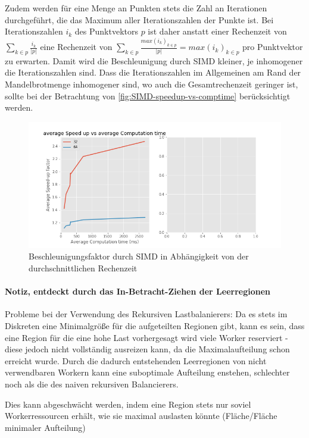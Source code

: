 Zudem werden für eine Menge an Punkten stets die Zahl an Iterationen durchgeführt,
die das Maximum aller Iterationszahlen der Punkte ist.
Bei Iterationszahlen \(i_k\) des Punktvektors \(p\) ist daher
anstatt einer Rechenzeit von \(\sum_{k \in p} \frac{i_k }{ | p | }\) eine Rechenzeit von
\(\sum_{k \in p} \frac{max(i_k)_{k \in p }}{|p|} = max(i_k)_{k \in p }\) pro Punktvektor zu erwarten.
Damit wird die Beschleunigung durch SIMD kleiner, je inhomogener die Iterationszahlen sind.
Dass die Iterationszahlen im Allgemeinen am Rand der Mandelbrotmenge inhomogener sind,
wo auch die Gesamtrechenzeit geringer ist, sollte bei der Betrachtung von \autoref{fig:SIMD-speedup-vs-comptime} berücksichtigt werden.

\begin{figure}
	\centering
	\includegraphics[width=0.9\linewidth]{img/Evaluation/speedupvscomptime}
	\caption{Beschleunigungsfaktor durch SIMD in Abhängigkeit von der durchschnittlichen Rechenzeit}
	\label{fig:SIMD-speedup-vs-comptime}
\end{figure}

\paragraph{Notiz, entdeckt durch das In-Betracht-Ziehen der Leerregionen}

Probleme bei der Verwendung des Rekursiven Lastbalanierers:
Da es stets im Diskreten eine Minimalgröße für die aufgeteilten Regionen gibt,
kann es sein, dass eine Region für die eine hohe Last vorhergesagt wird viele Worker reserviert -
diese jedoch nicht vollständig ausreizen kann, da die Maximalaufteilung schon erreicht wurde.
Durch die dadurch entstehenden Leerregionen von nicht verwendbaren Workern
kann eine suboptimale Aufteilung enstehen, schlechter noch als die des naiven rekursiven Balancierers.

Dies kann abgeschwächt werden, indem eine Region stets nur soviel Workerressourcen erhält,
wie sie maximal auslasten könnte (Fläche/Fläche minimaler Aufteilung)


